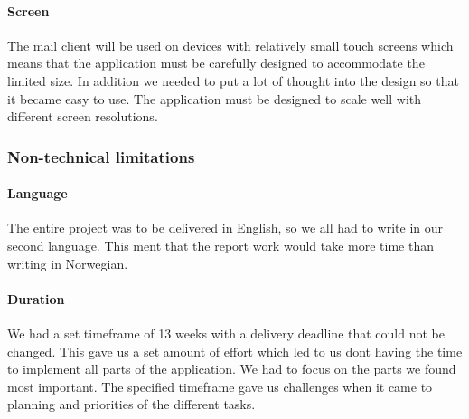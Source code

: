 \paragraph{Screen}\hfill
\newline
The mail client will be used on devices with relatively small touch screens which means that the application must be carefully designed to accommodate the limited size. In addition we needed to put a lot of thought into the design so that it became easy to use. The application must be designed to scale well with different screen resolutions.

\subsubsection{Non-technical limitations}

\paragraph{Language}\hfill
\newline
The entire project was to be delivered in English, so we all had to write in our second language. This ment that the report work would take more time than writing in Norwegian. 

\paragraph{Duration}\hfill
\newline
We had a set timeframe of 13 weeks with a delivery deadline that could not be changed. This gave us a set amount of effort which led to us dont having the time to implement all parts of the application. We had to focus on the parts we found most important. The specified timeframe gave us challenges when it came to planning and priorities of the different tasks.